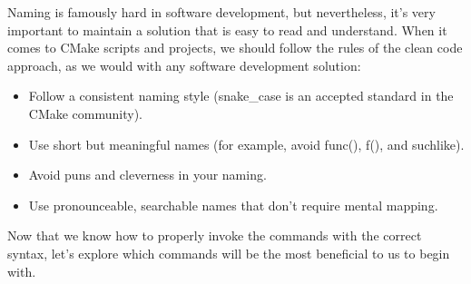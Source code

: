 Naming is famously hard in software development, but nevertheless, it's very important to maintain a solution that is easy to read and understand. When it comes to CMake scripts and projects, we should follow the rules of the clean code approach, as we would with any software development solution:

\begin{itemize}
\item 
Follow a consistent naming style (snake\_case is an accepted standard in the CMake community).

\item 
Use short but meaningful names (for example, avoid func(), f(), and suchlike).

\item 
Avoid puns and cleverness in your naming.

\item 
Use pronounceable, searchable names that don't require mental mapping.
\end{itemize}

Now that we know how to properly invoke the commands with the correct syntax, let's explore which commands will be the most beneficial to us to begin with.
















